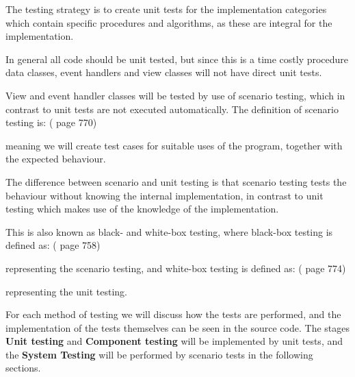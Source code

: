 The testing strategy is to create unit tests for the implementation categories which contain specific procedures and algorithms, as these are integral for the implementation.

In general all code should be unit tested, but since this is a time costly procedure data classes, event handlers and view classes will not have direct unit tests. 

View and event handler classes will be tested by use of scenario testing, which in contrast to unit tests are not executed automatically. The definition of scenario testing is: (\cite{SoftwareEngineering} page 770)


meaning we will create test cases for suitable uses of the program, together with the expected behaviour. 

The difference between scenario and unit testing is that scenario testing tests the behaviour without knowing the internal implementation, in contrast to unit testing which makes use of the knowledge of the implementation. 

This is also known as black- and white-box testing, where black-box testing is defined as: (\cite{SoftwareEngineering} page 758)


representing the scenario testing, and white-box testing is defined as: (\cite{SoftwareEngineering} page 774)


representing the unit testing.

For each method of testing we will discuss how the tests are performed, and the implementation of the tests themselves can be seen in the source code. The stages \textbf{Unit testing} and \textbf{Component testing} will be implemented by unit tests, and the \textbf{System Testing} will be performed by scenario tests in the following sections.